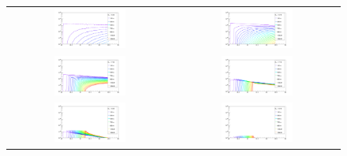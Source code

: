 	\begin{figure}[ht!]
		\centering
		\begin{tabular}{cc}
		\includegraphics[width=0.45\textwidth]{fig/resultadosRadio/weights16_25.png} &
		\includegraphics[width=0.45\textwidth]{fig/resultadosRadio/weights16_75.png} \\
		\includegraphics[width=0.45\textwidth]{fig/resultadosRadio/weights17_25.png} &
		\includegraphics[width=0.45\textwidth]{fig/resultadosRadio/weights17_75.png} \\
		\includegraphics[width=0.45\textwidth]{fig/resultadosRadio/weights18_25.png} &
		\includegraphics[width=0.45\textwidth]{fig/resultadosRadio/weights18_75.png} \\
		\end{tabular}


\end{figure}
